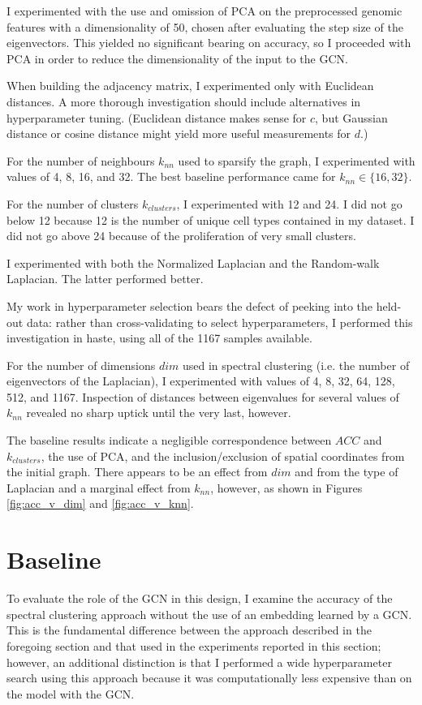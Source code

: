 \documentclass{article}
\newcommand{\nData}{1167}
\begin{document}
I experimented with the use and omission of PCA on the preprocessed genomic features with a dimensionality of 50, chosen after evaluating the step size of the eigenvectors. This yielded no significant bearing on accuracy, so I proceeded with PCA in order to reduce the dimensionality of the input to the GCN.

When building the adjacency matrix, I experimented only with Euclidean distances. A more thorough investigation should include alternatives in hyperparameter tuning. (Euclidean distance makes sense for $c$, but Gaussian distance or cosine distance might yield more useful measurements for $d$.)

For the number of neighbours $k_{nn}$ used to sparsify the graph, I experimented with values of 4, 8, 16, and 32. The best baseline performance came for $k_{nn} \in \{16,32\}$.

For the number of clusters $k_{clusters}$, I experimented with 12 and 24. I did not go below 12 because 12 is the number of unique cell types contained in my dataset. I did not go above 24 because of the proliferation of very small clusters.

I experimented with both the Normalized Laplacian and the Random-walk Laplacian. The latter performed better.

My work in hyperparameter selection bears the defect of peeking into the held-out data: rather than cross-validating to select hyperparameters, I performed this investigation in haste, using all of the \nData{} samples available.

For the number of dimensions $dim$ used in spectral clustering (i.e. the number of eigenvectors of the Laplacian), I experimented with values of 4, 8, 32, 64, 128, 512, and \nData{}. Inspection of distances between eigenvalues for several values of $k_{nn}$ revealed no sharp uptick until the very last, however.

The baseline results indicate a negligible correspondence between $ACC$ and $k_{clusters}$, the use of PCA, and the inclusion/exclusion of spatial coordinates from the initial graph. There appears to be an effect from $dim$ and from the type of Laplacian and a marginal effect from $k_{nn}$, however, as shown in Figures \ref{fig:acc_v_dim} and \ref{fig:acc_v_knn}.

\section{Baseline}

To evaluate the role of the GCN in this design, I examine the accuracy of the spectral clustering approach without the use of an embedding learned by a GCN. This is the fundamental difference between the approach described in the foregoing section and that used in the experiments reported in this section; however, an additional distinction is that I performed a wide hyperparameter search using this approach because it was computationally less expensive than on the model with the GCN.
\end{document}
